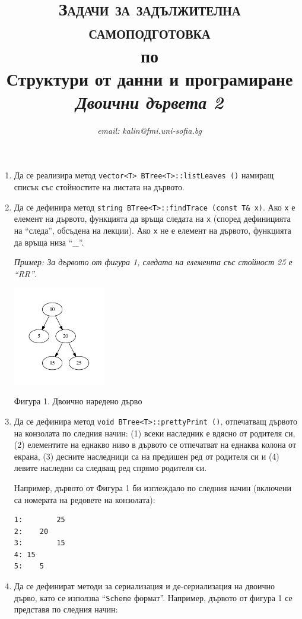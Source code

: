 \documentclass[12pt,a4paper]{article}
\author{\textit{email: kalin@fmi.uni-sofia.bg}}
\title{\textsc{Задачи за задължителна самоподготовка} \\
по \\
Структури от данни и програмиране\\
\textit{Двоични дървета 2}}
\begin{document}
\maketitle


\begin{enumerate}

	\item Да се реализира метод \texttt{vector<T> BTree<T>::listLeaves ()} намиращ списък със стойностите на листата на дървото.

	\item Да се дефинира метод \texttt{string BTree<T>::findTrace (const T\& x)}. Ако \texttt{x} е елемент на дървото, функцията да връща следата на \texttt{x} (според дефиницията на ``следа'', обсъдена на лекции). Ако \texttt{x} не е елемент на дървото, функцията да връща низа ``\_''.

	\textit{Пример: За дървото от фигура 1, следата на елемента със стойност 25 е ``RR''}.

	\begin{flushleft}
	\includegraphics[width=4cm]{images/tree1}

	Фигура 1. Двоично наредено дърво
	\end{flushleft}

	\item Да се дефинира метод \texttt{void BTree<T>::prettyPrint ()}, отпечатващ дървото на конзолата по следния начин: (1) всеки наследник е вдясно от родителя си, (2) елементите на еднакво ниво в дървото се отпечатват на еднаква колона от екрана, (3) десните наследници са на предишен ред от родителя си и (4) левите наследни са следващ ред спрямо родителя си.

	Например, дървото от Фигура 1 би изглеждало по следния начин (включени са номерата на редовете на конзолата):

\begin{verbatim}
1:        25
2:    20
3:        15
4: 15
5:    5
\end{verbatim}

	\item Да се дефинират методи за сериализация и де-сериализация на двоично дърво, като се използва ``\texttt{Scheme} формат''. Например, дървото от фигура 1 се представя по следния начин:


\end{enumerate}
\end{document}
